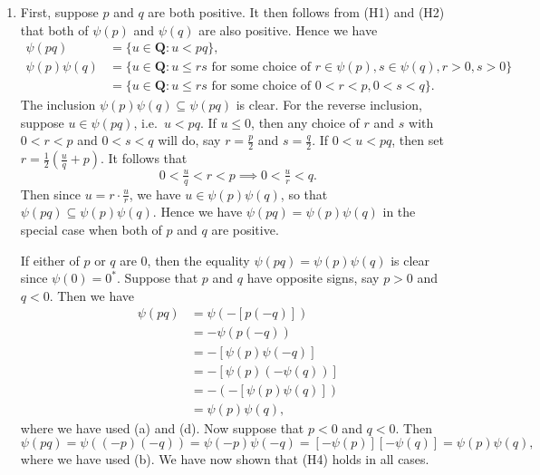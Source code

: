 \documentclass[12pt]{article}
\newcommand{\newp}{\vspace{5mm}}
\newcommand{\Q}{\mathbf{Q}}
\theoremstyle{definition}
\begin{document}
\begin{enumerate}[label = (H\arabic*), start = 2]
    \item First, suppose \( p \) and \( q \) are both positive. It then follows from (H1) and (H2) that both of \( \psi(p) \) and \( \psi(q) \) are also positive. Hence we have
    \begin{align*}
        \psi(pq) &= \{ u \in \Q : u < pq \}, \\
        \psi(p) \psi(q) &= \{ u \in \Q : u \leq rs \text{ for some choice of } r \in \psi(p), s \in \psi(q), r > 0, s > 0 \} \\
        &= \{ u \in \Q : u \leq rs \text{ for some choice of } 0 < r < p, 0 < s < q \}.
    \end{align*}
    The inclusion \( \psi(p) \psi(q) \subseteq \psi(pq) \) is clear. For the reverse inclusion, suppose \( u \in \psi(pq) \), i.e.\ \( u < pq \). If \( u \leq 0 \), then any choice of \( r \) and \( s \) with \( 0 < r < p \) and \( 0 < s < q \) will do, say \( r = \tfrac{p}{2} \) and \( s = \tfrac{q}{2} \). If \( 0 < u < pq \), then set \( r = \tfrac{1}{2}\left(\tfrac{u}{q} + p\right) \). It follows that
    \[
        0 < \tfrac{u}{q} < r < p \implies 0 < \tfrac{u}{r} < q.
    \]
    Then since \( u = r \cdot \tfrac{u}{r} \), we have \( u \in \psi(p) \psi(q) \), so that \( \psi(pq) \subseteq \psi(p) \psi(q) \). Hence we have \( \psi(pq) = \psi(p) \psi(q) \) in the special case when both of \( p \) and \( q \) are positive.

    \newp

    If either of \( p \) or \( q \) are 0, then the equality \( \psi(pq) = \psi(p) \psi(q) \) is clear since \( \psi(0) = 0^* \). Suppose that \( p \) and \( q \)  have opposite signs, say \( p > 0 \) and \( q < 0 \). Then we have
    \begin{align*}
        \psi(pq) &= \psi(-[p(-q)]) \\
        &= -\psi(p(-q)) \\
        &= -[\psi(p) \psi(-q)] \\
        &= -[\psi(p) (-\psi(q))] \\
        &= -(-[\psi(p) \psi(q)]) \\
        &= \psi(p) \psi(q),
    \end{align*}
    where we have used  (a) and  (d). Now suppose that \( p < 0 \) and \( q < 0 \). Then
    \[
        \psi(pq) = \psi((-p)(-q)) = \psi(-p) \psi(-q) = [-\psi(p)] [-\psi(q)] = \psi(p) \psi(q),
    \]
    where we have used  (b). We have now shown that (H4) holds in all cases.
\end{enumerate}
\end{document}
